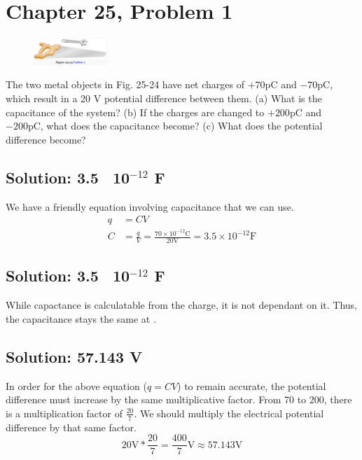 \documentclass[12pt]{article}
\begin{document}
\pagebreak
\section{Chapter 25, Problem 1}
\begin{figure}
    \vspace{-30pt}
    \includegraphics[width=0.25\textwidth]{picture_8.png} 
\end{figure}
The two metal objects in Fig. 25-24 have net charges of $+70 \unit{\pico\coulomb}$ and $-70 \unit{\pico\coulomb}$, which result in a 20 V potential difference between them. (a) What is the capacitance of the system? (b) If the
charges are changed to $+200 \unit{\pico\coulomb}$ and $-200 \unit{\pico\coulomb}$, what does the capacitance become? (c) What does the potential difference become?

\subsection{Solution: 3.5 \texttimes\ 10$^{-12}$ F}
We have a friendly equation involving capacitance that we can use.
\begin{align*}
    q   &=  CV\\
    C   &=  \frac{q}{V}
        =   \frac{70 \times 10^{-12} \unit{\coulomb}}{20 \unit{\volt}}
        =   \boxed{3.5 \times 10^{-12} \unit{\farad}}
\end{align*}

\subsection{Solution: 3.5 \texttimes\ 10$^{-12}$ F}
While capactance is calculatable from the charge, it is not dependant on it. 
Thus, the capacitance stays the same at .

\subsection{Solution: 57.143 V}
In order for the above equation ($q = CV$) to remain accurate, the potential difference must increase by the same multiplicative factor.
From 70 to 200, there is a multiplication factor of $\frac{20}{7}$. 
We should multiply the electrical potential difference by that same factor.
\begin{equation*}
    20 \unit{\volt} * \frac{20}{7} = \boxed{\frac{400}{7} \unit{\volt} \approx 57.143 \unit{\volt}}
\end{equation*}
\end{document}

